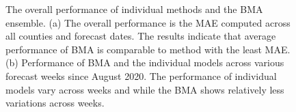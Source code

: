\documentclass[sigconf]{acmart}
\begin{document}
\begin{figure}
    \centering
    \caption{The overall performance of individual methods and the BMA ensemble. (a) The overall performance is the MAE computed across all counties and forecast dates. The results indicate that average performance of BMA is comparable to method with the least MAE. (b) Performance of BMA and the individual models across various forecast weeks since August 2020. The performance of individual models vary across weeks and while the BMA shows relatively less variations across weeks.}
\end{figure}
 
\end{document}
